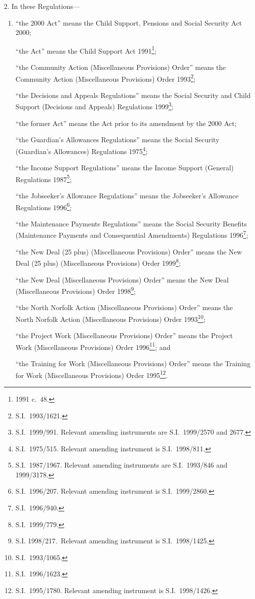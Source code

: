 \documentclass[12pt,a4paper]{article}
\begin{document}
2.  In these Regulations—
\begin{enumerate}\item[]
“the 2000 Act” means the Child Support, Pensions and Social Security Act 2000;

“the Act” means the Child Support Act 1991\footnote{1991 c.\ 48.};

\enlargethispage{-\baselineskip}

“the Community Action (Miscellaneous Provisions) Order” means the Community Action (Miscellaneous Provisions) Order 1993\footnote{S.I.\ 1993/1621.};

“the Decisions and Appeals Regulations” means the Social Security and Child Support (Decisions and Appeals) Regulations 1999\footnote{S.I.\ 1999/991. Relevant amending instruments are S.I.\ 1999/2570 and 2677.};

“the former Act” means the Act prior to its amendment by the 2000 Act;

“the Guardian’s Allowances Regulations” means the Social Security (Guardian’s Allowances) Regulations 1975\footnote{S.I.\ 1975/515. Relevant amending instrument is S.I.\ 1998/811.};

“the Income Support Regulations” means the Income Support (General) Regulations 1987\footnote{S.I.\ 1987/1967. Relevant amending instruments are S.I.\ 1993/846 and 1999/3178.};

“the Jobseeker’s Allowance Regulations” means the Jobseeker’s Allowance Regulations 1996\footnote{S.I.\ 1996/207. Relevant amending instrument is S.I.\ 1999/2860.};

“the Maintenance Payments Regulations” means the Social Security Benefits (Maintenance Payments and Consequential Amendments) Regulations 1996\footnote{S.I.\ 1996/940.};

“the New Deal (25 plus) (Miscellaneous Provisions) Order” means the New Deal (25 plus) (Miscellaneous Provisions) Order 1999\footnote{S.I.\ 1999/779.};

“the New Deal (Miscellaneous Provisions) Order” means the New Deal (Miscellaneous Provisions) Order 1998\footnote{S.I. 1998/217.\ Relevant amending instrument is S.I.\ 1998/1425.};

“the North Norfolk Action (Miscellaneous Provisions) Order” means the North Norfolk Action (Miscellaneous Provisions) Order 1993\footnote{S.I.\ 1993/1065.};

“the Project Work (Miscellaneous Provisions) Order” means the Project Work (Miscellaneous Provisions) Order 1996\footnote{S.I.\ 1996/1623.}; and

“the Training for Work (Miscellaneous Provisions) Order” means the Training for Work (Miscellaneous Provisions) Order 1995\footnote{S.I.\ 1995/1780. Relevant amending instrument is S.I.\ 1998/1426.}.
\end{enumerate}
\end{document}
